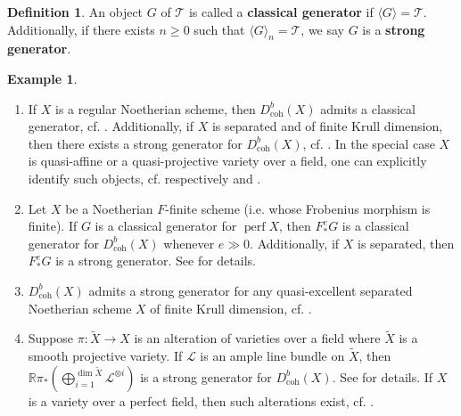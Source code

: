 \documentclass[11pt]{amsart}
\theoremstyle{plain}
\theoremstyle{definition}
\newtheorem{definition}[theorem]{Definition}
\newtheorem{example}[theorem]{Example}
\numberwithin{equation}{section}
\numberwithin{theorem}{section}
\begin{document}
\begin{definition}
    An object $G$ of $\mathcal{T}$ is called a \textbf{classical generator} if $\langle G \rangle = \mathcal{T}$. Additionally, if there exists $n\geq 0$ such that $\langle G \rangle_n = \mathcal{T}$, we say $G$ is a \textbf{strong generator}.
\end{definition}

\begin{example}
    \hfill
    \begin{enumerate}
        \item If $X$ is a regular Noetherian scheme, then $D^b_{\operatorname{coh}}(X)$ admits a classical generator, cf. \cite[Corollary 3.1.2]{BVdB:2003}. Additionally, if $X$ is separated and of finite Krull dimension, then there exists a strong generator for $D^b_{\operatorname{coh}}(X)$, cf. \cite[Theorem 0.5]{Neeman:2021}. In the special case $X$ is quasi-affine or a quasi-projective variety over a field, one can explicitly identify such objects, cf. respectively \cite[Corollary 5]{Olander:2023} and \cite[Theorem 4]{Orlov:2009}.
        \item Let $X$ be a Noetherian $F$-finite scheme (i.e. whose Frobenius morphism is finite). If $G$ is a classical generator for $\operatorname{perf}X$, then $F_\ast^e G$ is a classical generator for $D^b_{\operatorname{coh}}(X)$ whenever $e \gg 0$. Additionally, if $X$ is separated, then $F_\ast^e G$ is a strong generator. See \cite[Theorem A]{BILMP:2023} for details.
        \item $D^b_{\operatorname{coh}}(X)$ admits a strong generator for any quasi-excellent separated Noetherian scheme $X$ of finite Krull dimension, cf. \cite[Main Theorem]{Aoki:2021}.
        \item Suppose $\pi \colon \widetilde{X} \to X$ is an alteration of varieties over a field where $\widetilde{X}$ is a smooth projective variety. If $\mathcal{L}$ is an ample line bundle on $\widetilde{X}$, then $\mathbb{R}\pi_\ast (\bigoplus^{\dim \widetilde{X}}_{i=1} \mathcal{L}^{\otimes i})$ is a strong generator for $D^b_{\operatorname{coh}}(X)$. See \cite[Example 3.13]{Dey/Lank:2024} for details. If $X$ is a variety over a perfect field, then such alterations exist, cf. \cite[Theorem 4.1]{deJong:1996}.
    \end{enumerate}
\end{example}
\end{document}

